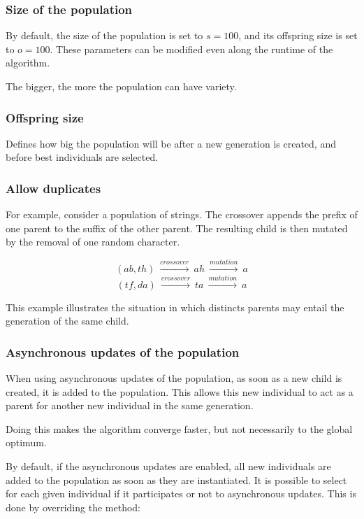 \documentclass{article}
\begin{document}
\subsubsection{Size of the population}

By default, the  size of the population is set to $s=100$, and its
offspring size is set to $o=100$. These parameters can be modified even along
the runtime of the algorithm.

The bigger, the more the population can
have variety.

\subsubsection{Offspring size}

Defines how big the population will be after a new generation is created, and
before best individuals are selected.

\subsubsection{Allow duplicates}


For example, consider a population of strings. The crossover appends the prefix
of one parent to the suffix of the other parent. The resulting child is then
mutated by the removal of one random character.

$$(ab, th)\ \xrightarrow{crossover}\  ah\  \xrightarrow{mutation}\  a$$
$$(tf, da)\ \xrightarrow{crossover}\  ta\  \xrightarrow{mutation}\  a$$

This example illustrates the situation in which distincts parents may entail the
generation of the same child.


 \subsubsection{Asynchronous updates of the population}

When using asynchronous updates of the population, as soon as a new child is
created, it is added to the population. This allows this new individual to act
as a parent for another new individual in the same generation.

Doing this makes the algorithm converge faster, but not necessarily to the
global optimum.

By default, if the asynchronous updates are enabled, all new individuals are
added to the population as soon as they are instantiated. It is possible to
select for each given individual if it participates or not to asynchronous
updates. This is done by overriding the method:
\end{document}
